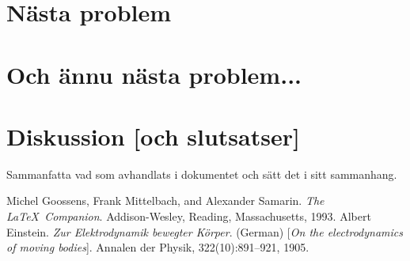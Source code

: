 \documentclass[a4paper,12pt]{article}
\begin{document}
\section{Nästa problem}
\label{sec:uppg2}


\section{Och ännu nästa problem...}
\label{sec:uppgN}


\section{Diskussion [och slutsatser]}
\label{sec:disk}


Sammanfatta vad som avhandlats i dokumentet och sätt det i
sitt sammanhang.
%
\begin{thebibliography}{99}
%
Michel Goossens, Frank Mittelbach, and Alexander Samarin. 
\textit{The \LaTeX\ Companion}. 
Addison-Wesley, Reading, Massachusetts, 1993.
%
Albert Einstein. 
\textit{Zur Elektrodynamik bewegter K{\"o}rper}. (German) 
[\textit{On the electrodynamics of moving bodies}]. 
Annalen der Physik, 322(10):891–921, 1905.
%
\end{thebibliography}
%
\end{document}
